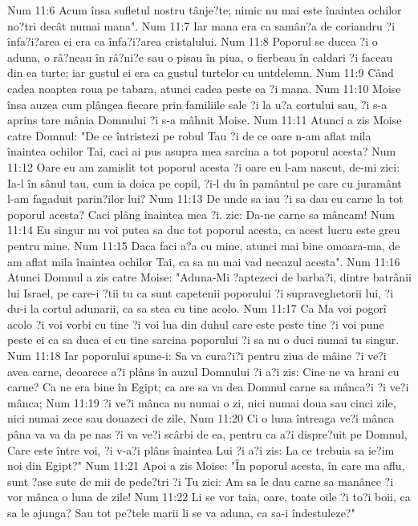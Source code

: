Num 11:6  Acum însa sufletul nostru tânje?te; nimic nu mai este înaintea ochilor no?tri decât numai mana".
Num 11:7  Iar mana era ca samân?a de coriandru ?i înfa?i?area ei era ca înfa?i?area cristalului.
Num 11:8  Poporul se ducea ?i o aduna, o râ?neau în râ?ni?e sau o pisau în piua, o fierbeau în caldari ?i faceau din ea turte; iar gustul ei era ca gustul turtelor cu untdelemn.
Num 11:9  Când cadea noaptea roua pe tabara, atunci cadea peste ea ?i mana.
Num 11:10  Moise însa auzea cum plângea fiecare prin familiile sale ?i la u?a cortului sau, ?i s-a aprins tare mânia Domnului ?i s-a mâhnit Moise.
Num 11:11  Atunci a zis Moise catre Domnul: "De ce întristezi pe robul Tau ?i de ce oare n-am aflat mila înaintea ochilor Tai, caci ai pus asupra mea sarcina a tot poporul acesta?
Num 11:12  Oare eu am zamislit tot poporul acesta ?i oare eu l-am nascut, de-mi zici: Ia-l în sânul tau, cum ia doica pe copil, ?i-l du în pamântul pe care cu juramânt l-am fagaduit parin?ilor lui?
Num 11:13  De unde sa iau ?i sa dau eu carne la tot poporul acesta? Caci plâng înaintea mea ?i. zic: Da-ne carne sa mâncam!
Num 11:14  Eu singur nu voi putea sa duc tot poporul acesta, ca acest lucru este greu pentru mine.
Num 11:15  Daca faci a?a cu mine, atunci mai bine omoara-ma, de am aflat mila înaintea ochilor Tai, ca sa nu mai vad necazul acesta".
Num 11:16  Atunci Domnul a zis catre Moise: "Aduna-Mi ?aptezeci de barba?i, dintre batrânii lui Israel, pe care-i ?tii tu ca sunt capetenii poporului ?i supraveghetorii lui, ?i du-i la cortul adunarii, ca sa stea cu tine acolo.
Num 11:17  Ca Ma voi pogorî acolo ?i voi vorbi cu tine ?i voi lua din duhul care este peste tine ?i voi pune peste ei ca sa duca ei cu tine sarcina poporului ?i sa nu o duci numai tu singur.
Num 11:18  Iar poporului spune-i: Sa va cura?i?i pentru ziua de mâine ?i ve?i avea carne, deoarece a?i plâns în auzul Domnului ?i a?i zis: Cine ne va hrani cu carne? Ca ne era bine în Egipt; ca are sa va dea Domnul carne sa mânca?i ?i ve?i mânca;
Num 11:19  ?i ve?i mânca nu numai o zi, nici numai doua sau cinci zile, nici numai zece sau douazeci de zile,
Num 11:20  Ci o luna întreaga ve?i mânca pâna va va da pe nas ?i va ve?i scârbi de ea, pentru ca a?i dispre?uit pe Domnul, Care este între voi, ?i v-a?i plâns înaintea Lui ?i a?i zis: La ce trebuia sa ie?im noi din Egipt?"
Num 11:21  Apoi a zis Moise: "În poporul acesta, în care ma aflu, sunt ?ase sute de mii de pede?tri ?i Tu zici: Am sa le dau carne sa manânce ?i vor mânca o luna de zile!
Num 11:22  Li se vor taia, oare, toate oile ?i to?i boii, ca sa le ajunga? Sau tot pe?tele marii li se va aduna, ca sa-i îndestuleze?"
